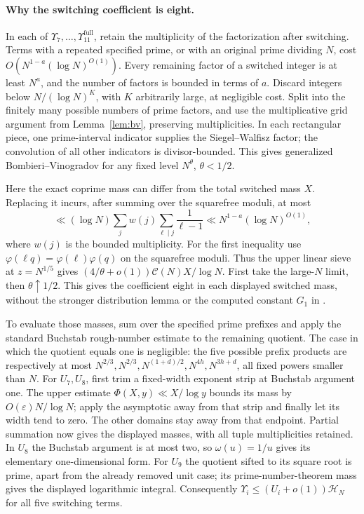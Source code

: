 \documentclass[11pt]{article}
\newcommand{\eps}{\varepsilon}
\newcommand{\CN}{\mathcal C(N)}
\newcommand{\HN}{\mathcal H_N}
\begin{document}
\paragraph{Why the switching coefficient is eight.}
In each of $\Upsilon_7,\ldots,\Upsilon_{11}^{\mathrm{full}}$, retain the multiplicity
of the factorization after switching. Terms with a repeated specified
prime, or with an original prime dividing $N$, cost
$O(N^{1-a}(\log N)^{O(1)})$. Every remaining factor of a switched
integer is at least $N^a$, and the number of factors is bounded in terms
of $a$. Discard integers below $N/(\log N)^K$, with $K$ arbitrarily
large, at negligible cost. Split into the finitely many possible numbers
of prime factors, and use the multiplicative grid argument from
Lemma~\ref{lem:bv}, preserving multiplicities. In each rectangular
piece, one prime-interval indicator supplies the Siegel--Walfisz factor;
the convolution of all other indicators is divisor-bounded.
This gives generalized Bombieri--Vinogradov for any fixed level
$N^\theta$, $\theta<1/2$.

Here the exact coprime mass can differ from the total switched mass $X$.
Replacing it incurs, after summing over the squarefree moduli, at most
\[
 \ll (\log N)\sum_j w(j)\sum_{\ell\mid j}\frac1{\ell-1}
 \ll N^{1-a}(\log N)^{O(1)},
\]
where $w(j)$ is the bounded multiplicity. For the first inequality use
$\varphi(\ell q)=\varphi(\ell)\varphi(q)$ on the squarefree moduli.
Thus the upper linear sieve at $z=N^{1/5}$ gives
$(4/\theta+o(1))\CN X/\log N$. First take the large-$N$ limit,
then $\theta\uparrow1/2$. This gives the coefficient eight in each
displayed switched mass, without the stronger distribution lemma or
the computed constant $G_1$ in \cite{Li2026}.

To evaluate those masses, sum over the specified prime prefixes and
apply the standard Buchstab rough-number estimate to the remaining
quotient. The case in which the quotient equals one is negligible:
the five possible prefix products are respectively at most
$N^{2/3},N^{2/3},N^{(1+d)/2},N^{4h},N^{3h+d}$, all fixed powers
smaller than $N$. For $U_7,U_8$, first trim a fixed-width exponent
strip at Buchstab argument one. The upper estimate
$\Phi(X,y)\ll X/\log y$ bounds its mass by $O(\eps)N/\log N$;
apply the asymptotic away from that strip and finally let its width
tend to zero. The other domains stay away from that endpoint.
Partial summation now gives the displayed masses, with all tuple
multiplicities retained. In $U_8$ the Buchstab argument is at most
two, so $\omega(u)=1/u$ gives its elementary one-dimensional form.
For $U_9$ the quotient sifted to its square root is prime, apart from
the already removed unit case; its prime-number-theorem mass gives
the displayed logarithmic integral. Consequently
$\Upsilon_i\le(U_i+o(1))\HN$ for all five switching terms.
\end{document}
